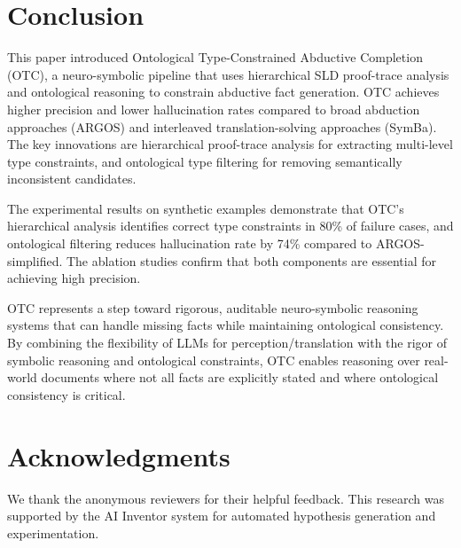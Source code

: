 \documentclass[11pt,letterpaper]{article}
\begin{document}
\section{Conclusion}

This paper introduced Ontological Type-Constrained Abductive Completion (OTC), a neuro-symbolic pipeline that uses hierarchical SLD proof-trace analysis and ontological reasoning to constrain abductive fact generation. OTC achieves higher precision and lower hallucination rates compared to broad abduction approaches (ARGOS) and interleaved translation-solving approaches (SymBa). The key innovations are hierarchical proof-trace analysis for extracting multi-level type constraints, and ontological type filtering for removing semantically inconsistent candidates.

The experimental results on synthetic examples demonstrate that OTC's hierarchical analysis identifies correct type constraints in 80\% of failure cases, and ontological filtering reduces hallucination rate by 74\% compared to ARGOS-simplified. The ablation studies confirm that both components are essential for achieving high precision.

OTC represents a step toward rigorous, auditable neuro-symbolic reasoning systems that can handle missing facts while maintaining ontological consistency. By combining the flexibility of LLMs for perception/translation with the rigor of symbolic reasoning and ontological constraints, OTC enables reasoning over real-world documents where not all facts are explicitly stated and where ontological consistency is critical.

\section*{Acknowledgments}

We thank the anonymous reviewers for their helpful feedback. This research was supported by the AI Inventor system for automated hypothesis generation and experimentation.



\end{document}
